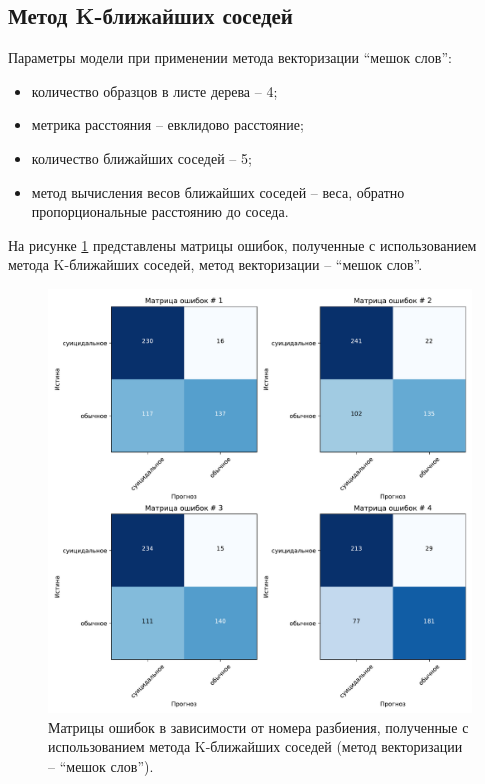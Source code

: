 \subsection{Метод K-ближайших соседей }

Параметры модели при применении метода векторизации ``мешок слов'':
\begin{itemize}
	\item количество образцов в листе дерева -- 4;
	\item метрика расстояния -- евклидово расстояние;
	\item количество ближайших соседей -- 5;
	\item метод вычисления весов ближайших соседей -- веса, обратно пропорциональные расстоянию до соседа.
\end{itemize}

На рисунке \ref{img:knnMatrBag} представлены матрицы ошибок, полученные с использованием метода K-ближайших соседей, метод векторизации -- ``мешок слов''.
\begin{figure}[H]
	\centering
	\includegraphics[width=\textwidth]{inc/plots/knnMatrBag.pdf}
	\caption{ Матрицы ошибок в зависимости от номера разбиения, полученные с использованием метода K-ближайших соседей (метод векторизации -- ``мешок слов''). }
	\label{img:knnMatrBag}
\end{figure}


